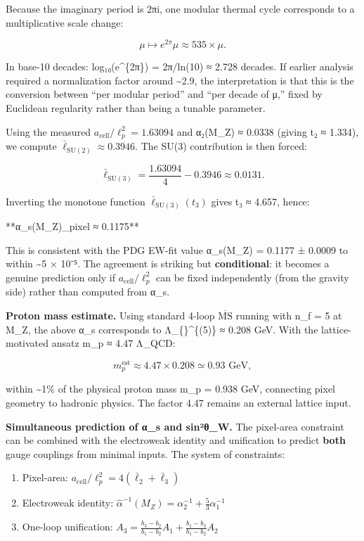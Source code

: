 \documentclass[
]{article}
\providecommand{\tightlist}{%
  \setlength{\itemsep}{0pt}\setlength{\parskip}{0pt}}
\begin{document}
Because the imaginary period is 2πi, one modular thermal cycle
corresponds to a multiplicative scale change:

\[
\mu \mapsto e^{2\pi} \mu \approx 535 \times \mu.
\]

In base-10 decades: log₁₀(e\^{}\{2π\}) = 2π/ln(10) ≈ 2.728 decades. If
earlier analysis required a normalization factor around
\textasciitilde2.9, the interpretation is that this is the conversion
between ``per modular period'' and ``per decade of μ,'' fixed by
Euclidean regularity rather than being a tunable parameter.

Using the measured \(a_{\mathrm{cell}}/\ell_p^2 = 1.63094\) and α₂(M\_Z)
≈ 0.0338 (giving t₂ ≈ 1.334), we compute
\(\bar{\ell}_{\mathrm{SU}(2)} ≈ 0.3946\). The SU(3) contribution is then
forced:

\[
\bar{\ell}_{\mathrm{SU}(3)} = \frac{1.63094}{4} - 0.3946 \approx 0.0131.
\]

Inverting the monotone function \(\bar{\ell}_{\mathrm{SU}(3)}(t_3)\)
gives t₃ ≈ 4.657, hence:

**α\_s(M\_Z)\textbar\_pixel ≈ 0.1175**

This is consistent with the PDG EW-fit value α\_s(M\_Z) = 0.1177 ±
0.0009 to within \textasciitilde5 × 10⁻⁵. The agreement is striking but
\textbf{conditional}: it becomes a genuine prediction only if
\(a_{\mathrm{cell}}/\ell_p^2\) can be fixed independently (from the
gravity side) rather than computed from α\_s.

\textbf{Proton mass estimate.} Using standard 4-loop
\(\overline{\mathrm{MS}}\) running with n\_f = 5 at M\_Z, the above α\_s
corresponds to Λ\_\{\}\^{}\{(5)\} ≈ 0.208 GeV.
With the lattice-motivated ansatz m\_p ≈ 4.47 Λ\_QCD:

\[
m_p^{\mathrm{est}} \approx 4.47 \times 0.208 \simeq 0.93 \text{ GeV},
\]

within \textasciitilde1\% of the physical proton mass m\_p = 0.938 GeV,
connecting pixel geometry to hadronic physics. The factor 4.47 remains
an external lattice input.

\textbf{Simultaneous prediction of α\_s and sin²θ\_W.} The pixel-area
constraint can be combined with the electroweak identity and unification
to predict \textbf{both} gauge couplings from minimal inputs. The system
of constraints:

\begin{enumerate}
\def\labelenumi{\arabic{enumi}.}
\tightlist
\item
  Pixel-area:
  \(a_{\mathrm{cell}}/\ell_p^2 = 4(\bar{\ell}_2 + \bar{\ell}_3)\)
\item
  Electroweak identity:
  \(\hat{\alpha}^{-1}(M_Z) = \alpha_2^{-1} + \frac{5}{3}\alpha_1^{-1}\)
\item
  One-loop unification:
  \(A_3 = \frac{b_3-b_2}{b_1-b_2}A_1 + \frac{b_1-b_3}{b_1-b_2}A_2\)
\end{enumerate}
\end{document}

